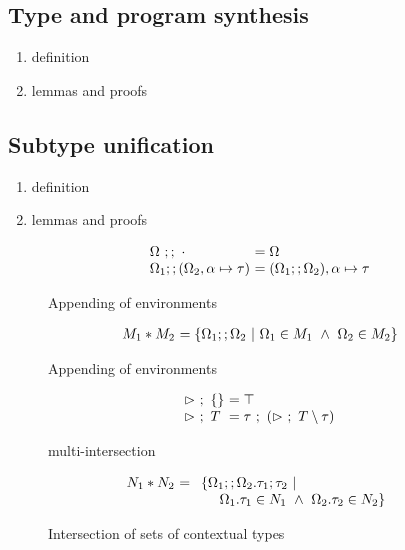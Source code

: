 \documentclass[sigplan,screen]{acmart}
\begin{document}
\subsection{Type and program synthesis}
\begin{enumerate}
  \item definition 
  \item lemmas and proofs 
\end{enumerate}

\subsection{Subtype unification}
\begin{enumerate}
  \item definition 
  \item lemmas and proofs 
\end{enumerate}

\begin{figure}[h]
  \[
    \begin{array}{l @{} l}
    \Omega\ ;;\ \cdot
    &\ = \Omega 
    \\
    \Omega_1;;(\Omega_2,\alpha \mapsto \tau) 
    &\ = (\Omega_1;;\Omega_2),\alpha \mapsto \tau
    \end{array}
  \]

  \caption{Appending of environments}
\end{figure}

\begin{figure}[h]
  \[
    \begin{array}{l @{} l}
    M_1 * M_2 
    &\ = 
    \{ \Omega_1 ;; \Omega_2 \ |\ 
      \Omega_1 \in M_1
      \ \wedge\ 
      \Omega_2 \in M_2
    \}
    \end{array}
  \]

  \caption{Appending of environments}
\end{figure}

\begin{figure}[h]
  \[
    \begin{array}{l @{} l}
    \rhd\ ;\ \{ \} 
    &\ = \top
    \\
    \rhd\ ;\ T
    &\ = \tau\ ;\ (\rhd\ ;\ T \setminus \tau)
    \end{array}
  \]

  \caption{multi-intersection}
\end{figure}

\begin{figure}[h]
  \[
    \begin{array}{l @{} l}
      N_1 * N_2
      &\ = 
      \begin{array}[t]{l}
        \{ \Omega_1 ;; \Omega_2 . \tau_1;\tau_2 \ |\ 
          \\
          \ \ \ \ \Omega_1.\tau_1 \in N_1
          \ \wedge\ 
          \Omega_2.\tau_2 \in N_2
        \}
      \end{array}
    \end{array}
  \]

  \caption{Intersection of sets of contextual types}
\end{figure}
\end{document}
